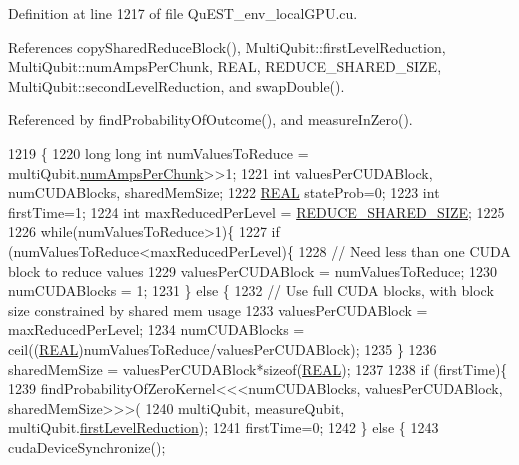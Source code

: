 Definition at line 1217 of file Qu\+E\+S\+T\+\_\+env\+\_\+local\+G\+P\+U.\+cu.



References copy\+Shared\+Reduce\+Block(), Multi\+Qubit\+::first\+Level\+Reduction, Multi\+Qubit\+::num\+Amps\+Per\+Chunk, R\+E\+AL, R\+E\+D\+U\+C\+E\+\_\+\+S\+H\+A\+R\+E\+D\+\_\+\+S\+I\+ZE, Multi\+Qubit\+::second\+Level\+Reduction, and swap\+Double().



Referenced by find\+Probability\+Of\+Outcome(), and measure\+In\+Zero().


\begin{DoxyCode}
1219 \{
1220     \textcolor{keywordtype}{long} \textcolor{keywordtype}{long} \textcolor{keywordtype}{int} numValuesToReduce = multiQubit.\mbox{\hyperlink{structMultiQubit_a1cad83601a78635dd278259c7ed54f18}{numAmpsPerChunk}}>>1;
1221     \textcolor{keywordtype}{int} valuesPerCUDABlock, numCUDABlocks, sharedMemSize;
1222     \mbox{\hyperlink{QuEST__precision_8h_a4b654506f18b8bfd61ad2a29a7e38c25}{REAL}} stateProb=0;
1223     \textcolor{keywordtype}{int} firstTime=1;
1224     \textcolor{keywordtype}{int} maxReducedPerLevel = \mbox{\hyperlink{QuEST__env__localGPU_8cu_aa57d77a0903e334e963c66ddc5ed3f53}{REDUCE\_SHARED\_SIZE}};
1225 
1226     \textcolor{keywordflow}{while}(numValuesToReduce>1)\{ 
1227         \textcolor{keywordflow}{if} (numValuesToReduce<maxReducedPerLevel)\{
1228             \textcolor{comment}{// Need less than one CUDA block to reduce values}
1229             valuesPerCUDABlock = numValuesToReduce;
1230             numCUDABlocks = 1;
1231         \} \textcolor{keywordflow}{else} \{
1232             \textcolor{comment}{// Use full CUDA blocks, with block size constrained by shared mem usage}
1233             valuesPerCUDABlock = maxReducedPerLevel;
1234             numCUDABlocks = ceil((\mbox{\hyperlink{QuEST__precision_8h_a4b654506f18b8bfd61ad2a29a7e38c25}{REAL}})numValuesToReduce/valuesPerCUDABlock);
1235         \}
1236         sharedMemSize = valuesPerCUDABlock*\textcolor{keyword}{sizeof}(\mbox{\hyperlink{QuEST__precision_8h_a4b654506f18b8bfd61ad2a29a7e38c25}{REAL}});
1237 
1238         \textcolor{keywordflow}{if} (firstTime)\{
1239             findProbabilityOfZeroKernel<<<numCUDABlocks, valuesPerCUDABlock, sharedMemSize>>>(
1240                     multiQubit, measureQubit, multiQubit.\mbox{\hyperlink{structMultiQubit_a4e0088b41adab0a40b7a31e528ed42b5}{firstLevelReduction}});
1241             firstTime=0;
1242         \} \textcolor{keywordflow}{else} \{
1243             cudaDeviceSynchronize();    

\end{DoxyCode}
